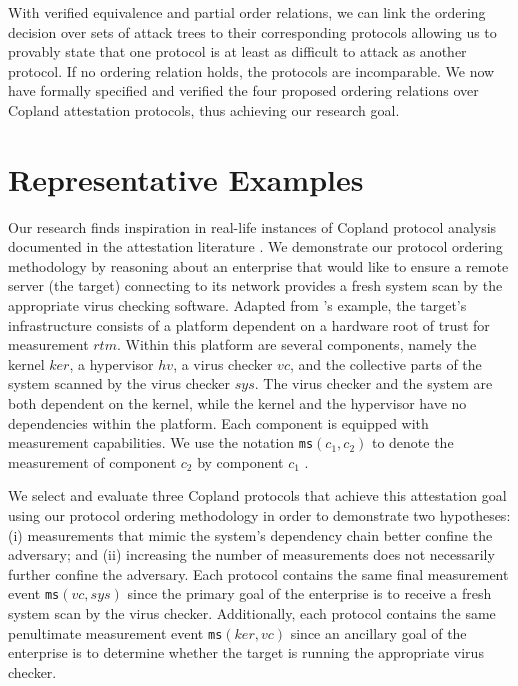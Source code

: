 \documentclass[runningheads]{llncs}
\theoremstyle{definition}
\begin{document}
With verified equivalence and partial order relations, we can link the
ordering decision over sets of attack trees to their corresponding
protocols allowing us to provably state that one protocol is at least
as difficult to attack as another protocol. If no ordering relation
holds, the protocols are incomparable. We now have formally specified
and verified the four proposed ordering relations over Copland
attestation protocols, thus achieving our research goal.

\section{Representative Examples}

Our research finds inspiration in real-life instances of Copland
protocol analysis documented in the attestation literature
\citep{Rowe:2021:OnOrdering,Coker::Principles-of-R}. We demonstrate
our protocol ordering methodology by reasoning about an enterprise
that would like to ensure a remote server (the target) connecting to
its network provides a fresh system scan by the appropriate virus
checking software. Adapted from \citeauthor{Rowe:2021:OnOrdering}'s
\citep{Rowe:2016:Confining} example, the target's infrastructure
consists of a platform dependent on a hardware root of trust for
measurement $rtm$. Within this platform are several components, namely
the kernel $ker$, a hypervisor $hv$, a virus checker $vc$, and the
collective parts of the system scanned by the virus checker $sys$. The
virus checker and the system are both dependent on the kernel, while
the kernel and the hypervisor have no dependencies within the
platform. Each component is equipped with measurement capabilities. We
use the notation \texttt{ms}$(c_1,c_2)$ to denote the measurement of
component $c_2$ by component $c_1$ .

We select and evaluate three Copland protocols that achieve this
attestation goal using our protocol ordering methodology in order to
demonstrate two hypotheses: (i) measurements that mimic the system's
dependency chain better confine the adversary; and (ii) increasing the
number of measurements does not necessarily further confine the
adversary. Each protocol contains the same final measurement event
\texttt{ms}$(vc,sys)$ since the primary goal of the enterprise is to
receive a fresh system scan by the virus checker. Additionally, each
protocol contains the same penultimate measurement event
\texttt{ms}$(ker,vc)$ since an ancillary goal of the enterprise is to
determine whether the target is running the appropriate virus checker.
\end{document}

